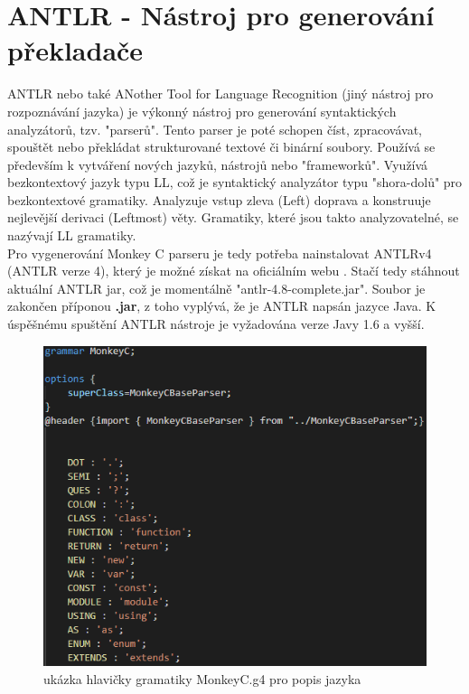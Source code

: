 \section{ANTLR - Nástroj pro generování překladače} \label{antlr}
ANTLR nebo také ANother Tool for Language Recognition (jiný nástroj pro rozpoznávání jazyka) \cite{ANTLR_2021} je výkonný nástroj pro generování syntaktických analyzátorů, tzv. "parserů". Tento parser je poté schopen číst, zpracovávat, spouštět nebo překládat strukturované textové či binární soubory. Používá se především k vytváření nových jazyků, nástrojů nebo "frameworků". Využívá bezkontextový jazyk typu LL, což je syntaktický analyzátor typu "shora-dolů" pro bezkontextové gramatiky. Analyzuje vstup zleva (Left) doprava a konstruuje nejlevější derivaci (Leftmost) věty. Gramatiky, které jsou takto analyzovatelné, se nazývají LL gramatiky.\\
Pro vygenerování Monkey C parseru je tedy potřeba nainstalovat ANTLRv4 (ANTLR verze 4), který je možné získat na oficiálním webu \cite{ANTLR_2021}. Stačí tedy stáhnout aktuální ANTLR jar, což je momentálně "antlr-4.8-complete.jar". Soubor je zakončen příponou \textbf{.jar}, z toho vyplývá, že je ANTLR napsán jazyce Java. K úspěšnému spuštění ANTLR nástroje je vyžadována verze Javy 1.6 a vyšší.

\begin{figure}[b!]
	\centering
	\includegraphics[scale=0.8]{images/grammar}
	\caption{ukázka hlavičky gramatiky MonkeyC.g4 pro popis jazyka}
	\label{img:grammar}
\end{figure}

